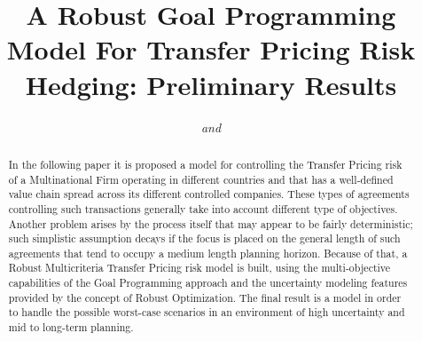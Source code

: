 \documentclass[conference,final,a4paper]{IEEEtran}
\begin{document}
\title{A Robust Goal Programming Model For Transfer Pricing Risk Hedging: Preliminary Results}

\author{
\and
{}
\textit{and}\\
\and
{}
}

\maketitle

\begin{abstract}
In the following paper it is proposed a model for controlling the Transfer Pricing risk of a Multinational Firm operating in different countries and that has a well-defined value chain spread across its different controlled companies. These types of agreements controlling such transactions generally take into account different type of objectives. Another problem arises by the process itself that may appear to be fairly deterministic; such simplistic assumption decays if the focus is placed on the general length of such agreements that tend to occupy a medium length planning horizon. Because of that, a Robust Multicriteria Transfer Pricing risk model is built, using the multi-objective capabilities of the Goal Programming approach and the uncertainty modeling features provided by the concept of Robust Optimization. The final result is a model in order to handle the possible worst-case scenarios in an environment of high uncertainty and mid to long-term planning.
\end{abstract}
\end{document}
